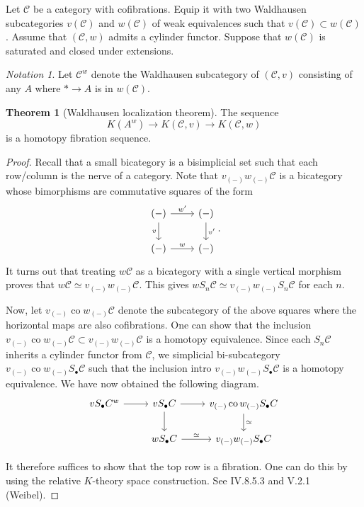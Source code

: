 \documentclass[10pt,letterpaper,cm]{nupset}
\theoremstyle{definition}
\theoremstyle{theorem}
\newtheorem{theorem}{Theorem}
\theoremstyle{remark}
\newtheorem*{notation}{Notation}
\newcommand{\1}{\mathbf{1}}
\renewcommand{\c}{\mathscr{C}}
\newcommand{\0}{\vec 0}
\DeclareMathOperator{\co}{co}
\begin{document}
Let $\c$ be a category with cofibrations. Equip it with two Waldhausen subcategories $v(\c)$ and $w(\c)$ of weak equivalences such that $v(\c) \subset w(\c)$. Assume that $(\c, w)$ admits a cylinder functor. Suppose that $w(\c)$ is saturated and closed under extensions. 
\begin{notation}
Let $\c^w$ denote the Waldhausen subcategory of $(\c, v)$ consisting of any $A$ where $\ast \to A$ is in $w(\c)$.
\end{notation}

\begin{theorem}[Waldhausen localization theorem]
The sequence $$ K(A^w) \to K(\c, v) \to K(\c, w) $$ is a homotopy fibration sequence.
\end{theorem}
\begin{proof}
Recall that a small bicategory is a bisimplicial set such that each row/column is the nerve of a category. Note that $v_{(-)}w_{(-)}\c$ is a bicategory whose bimorphisms are commutative squares of the form
\[
\begin{tikzcd}
(-) \arrow[r, "w'"] \arrow[d, "v"'] & (-) \arrow[d, "v'"] \\
(-) \arrow[r, "w"] & (-)
\end{tikzcd}.
\]
It turns out that treating $w \c$ as a bicategory with a single vertical morphism proves that $w \c \simeq v_{(-)}w_{(-)}\c$. This gives $wS_n \c \simeq v_{(-)}w_{(-)}S_n\c$ for each $n$.

\medskip

 Now, let $v_{(-)}\co w_{(-)}\c$ denote the subcategory of the above squares where the horizontal maps are also cofibrations. One can show that the inclusion $v_{(-)}\co w_{(-)}\c \subset v_{(-)}w_{(-)}\c$ is a homotopy equivalence. Since each $S_n \c$ inherits a cylinder functor from $\c$, we simplicial bi-subcategory $v_{(-)}\co w_{(-)}S_{\bullet}\c$ such that the inclusion intro $v_{(-)}w_{(-)}S_{\bullet}\c$ is a homotopy equivalence. We have now obtained the following diagram.
\[
\begin{tikzcd}
vS_{\bullet}C^w \arrow[r] & vS_{\bullet}C \arrow[r] \arrow[d] & v_{(-)}\co w_{(-)}S_{\bullet}C \arrow[d, "\simeq"] \\
 & wS_{\bullet}C \arrow[r, "\simeq"] & v_{(-)}w_{(-)}S_{\bullet}C
\end{tikzcd}
\]

\medskip

 It therefore suffices to show that the top row is a fibration. One can do this by using the relative $K$-theory space construction. See IV.8.5.3 and V.2.1 (Weibel).
\end{proof}
\end{document}
